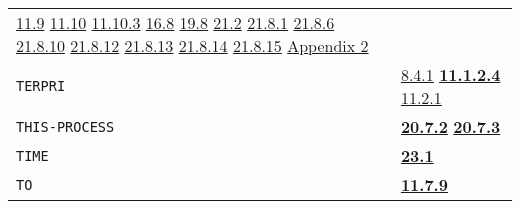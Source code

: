 \documentclass[a4paper,]{article}
\begin{document}
\begin{longtable}[]{@{}ll@{}}
\begin{minipage}[t]{0.70\columnwidth}
\href{11-input-output.md\#119-internal-channels}{11.9}
\href{11-input-output.md\#1110-the-net-device-the-arpa-network}{11.10} \href{11-input-output.md\#11103-nets}{11.10.3}
\href{16-errors-frames-etc.md\#168-control-s-s}{16.8} \href{19-compiled-programs.md\#198-rsubrs-in-files}{19.8}
\href{21-interrupts.md\#212-event}{21.2} \href{21-interrupts.md\#2181-char-received}{21.8.1}
\href{21-interrupts.md\#2186-clock}{21.8.6} \href{21-interrupts.md\#21810-sysdown}{21.8.10}
\href{21-interrupts.md\#21812-ipc}{21.8.12} \href{21-interrupts.md\#21813-inferior}{21.8.13}
\href{21-interrupts.md\#21814-runt-and-realt}{21.8.14} \href{21-interrupts.md\#21815-dangerous-interrupts}{21.8.15}
\href{appendix-2-predefined-subroutines.md\#appendix-2-predefined-subroutines}{Appendix 2}\strut
\end{minipage}\tabularnewline
\begin{minipage}[t]{0.24\columnwidth}\raggedright\strut
\texttt{TERPRI}\strut
\end{minipage} & \begin{minipage}[t]{0.70\columnwidth}\raggedright\strut
\href{08-truth.md\#841-and-and-or-as-short-conds}{8.4.1} \textbf{\href{11-input-output.md\#11124-terpri}{11.1.2.4}}
\href{11-input-output.md\#1121-open}{11.2.1}\strut
\end{minipage}\tabularnewline
\begin{minipage}[t]{0.24\columnwidth}\raggedright\strut
\texttt{THIS-PROCESS}\strut
\end{minipage} & \begin{minipage}[t]{0.70\columnwidth}\raggedright\strut
\textbf{\href{20-coroutines.md\#2072-main}{20.7.2}} \textbf{\href{20-coroutines.md\#2073-me}{20.7.3}}\strut
\end{minipage}\tabularnewline
\begin{minipage}[t]{0.24\columnwidth}\raggedright\strut
\texttt{TIME}\strut
\end{minipage} & \begin{minipage}[t]{0.70\columnwidth}\raggedright\strut
\textbf{\href{23-mdl-as-a-system-process.md\#231-time}{23.1}}\strut
\end{minipage}\tabularnewline
\begin{minipage}[t]{0.24\columnwidth}\raggedright\strut
\texttt{TO}\strut
\end{minipage} & \begin{minipage}[t]{0.70\columnwidth}\raggedright\strut
\textbf{\href{11-input-output.md\#1179-rename}{11.7.9}}\strut
\end{minipage}\tabularnewline

\end{longtable}
\end{document}
